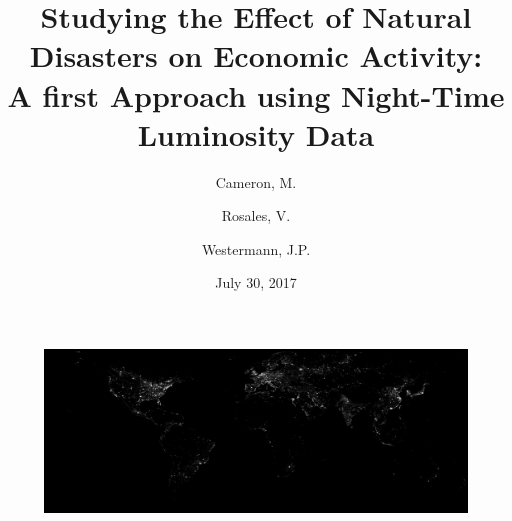 \documentclass[12.5pt,fleqn,leqno,letterpaper]{article}
\title{
  Studying the Effect of Natural Disasters on Economic Activity:\\
  \large{A first Approach using Night-Time Luminosity Data}
}
\author{Cameron, M. \and Rosales, V. \and Westermann, J.P.}
\date{July 30, 2017}
\begin{document}
\maketitle
\begin{figure}[H]
  \centering
  \includegraphics[width=1\linewidth]{lum_2013}\label{lum_2013}
\end{figure}			
\newpage
\tableofcontents
\listoffigures
\listoftables

\newpage
\end{document}
